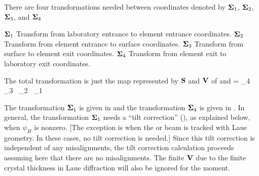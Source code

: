 There are four transformations needed between coordinates
denoted by ${\bf \Sigma}_1$, ${\bf \Sigma}_2$, ${\bf \Sigma}_3$, and ${\bf \Sigma}_4$
\begin{example}
  \({\bf \Sigma}_1\)  Transform from laboratory entrance to element entrance coordinates.  
  \({\bf \Sigma}_2\)  Transform from element entrance to surface coordinates.  
  \({\bf \Sigma}_3\)  Transform from surface to element exit coordinates.  
  \({\bf \Sigma}_4\)  Transform from element exit to laboratory exit coordinates.  
\end{example}
The total transformation is just the map represented by ${\bf S}$ and
${\bf V}$ of  and 
\Begineq
  [\bfS, \bfV] = \Bf\Sigma_4 \, \Bf\Sigma_3 \, \Bf\Sigma_2 \, \Bf\Sigma_1
\Endeq

The transformation ${\bf \Sigma}_1$ is given in
 and the transformation ${\bf \Sigma}_4$ is
given in . In general, the transformation
${\bf \Sigma}_1$ needs a ``tilt correction'' (), as explained
below, when $\psi_H$ is nonzero.  [The exception is when the
 or  beam is tracked with Laue
geometry. In these cases, no tilt correction is needed.] Since this
tilt correction is independent of any misalignments, the tilt
correction calculation proceeds assuming here that there are no
misalignments. The finite ${\bf V}$ due to the finite crystal thickness
in Laue diffraction will also be ignored for the moment.


